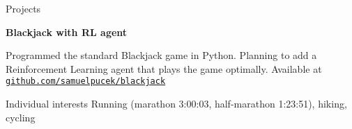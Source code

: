 \documentclass[
	11pt, %
]{resume} %
\begin{document}

\begin{rSection}{Projects}
	
	{\bf Blackjack with RL agent}

	Programmed the standard Blackjack game in Python. Planning to add a Reinforcement Learning agent that plays the game optimally. Available at \href{https://github.com/samuelpucek/blackjack}{\texttt{github.com/samuelpucek/blackjack}} %

\end{rSection}

\begin{rSection}{Individual interests}
	Running (marathon 3:00:03, half-marathon 1:23:51), hiking, cycling
	\end{rSection}
	
	
\end{document}
